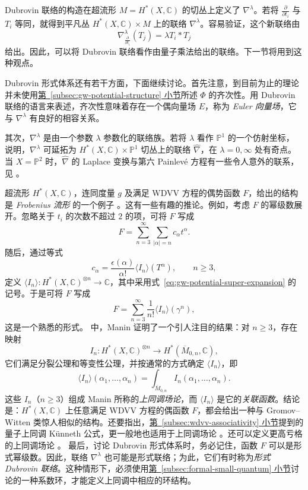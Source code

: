 Dubrovin 联络的构造在超流形 $M=H^*(X,\mathbb C)$ 的切丛上定义了 $\nabla^\lambda$。若将 $\frac{\partial}{\partial t_i}$ 与 $T_i$ 等同，就得到平凡丛
$H^*(X,\mathbb C)\times M$ 上的联络 $\nabla^\lambda$。容易验证，这个新联络由
\[
\nabla^\lambda_{\frac{\partial}{\partial t_i}}(T_j)=\lambda T_i*T_j
\]
给出。因此，可以将 Dubrovin 联络看作由量子乘法给出的联络。下一节将用到这种观点。

Dubrovin 形式体系还有若干方面，下面继续讨论。首先注意，到目前为止的理论并未使用\hyperref[subsec:gw-potential-structure]{第~\ref*{subsec:gw-potential-structure} 小节}所述 $\Phi$ 的齐次性。用 Dubrovin 联络的语言来表述，齐次性意味着存在一个偶向量场 $E$，称为 \emph{Euler 向量场}，它与 $\nabla^\lambda$ 有良好的相容关系。

其次，$\nabla^\lambda$ 是由一个参数 $\lambda$ 参数化的联络族。若将 $\lambda$ 看作 $\mathbb P^1$ 的一个仿射坐标， 说明，$\nabla^\lambda$ 可延拓为 $H^*(X,\mathbb C)\times\mathbb P^1$ 切丛上的联络 $\widehat\nabla$，在 $\lambda=0,\infty$ 处有奇点。当 $X=\mathbb P^2$ 时，$\widehat\nabla$ 的 Laplace 变换与第六 Painlevé 方程有一些令人意外的联系，见 。

超流形 $H^*(X,\mathbb C)$，连同度量 $g$ 及满足 WDVV 方程的偶势函数 $F$，给出的结构是 \emph{Frobenius 流形} 的一个例子 。这有一些有趣的推论。例如，考虑 $F$ 的幂级数展开。忽略关于 $t_i$ 的次数不超过 $2$ 的项，可将 $F$ 写成
\[
F=\sum_{n=3}^{\infty}\sum_{|\alpha|=n}c_\alpha t^\alpha.
\]
随后，通过等式
\[
c_\alpha=\frac{\epsilon(\alpha)}{\alpha!}\langle I_n\rangle(T^\alpha),\qquad n\ge3,
\]
定义 $\langle I_n\rangle\colon H^*(X,\mathbb C)^{\otimes n}\to\mathbb C$，其中采用式~\eqref{eq:gw-potential-super-expansion} 的记号。于是可将 $F$ 写成
\[
F=\sum_{n=3}^{\infty}\frac1{n!}\langle I_n\rangle(\gamma^n),
\]
这是一个熟悉的形式。 中，Manin 证明了一个引人注目的结果：对 $n\ge3$，存在映射
\[
I_n\colon H^*(X,\mathbb C)^{\otimes n}\longrightarrow
H^*(\overline M_{0,n},\mathbb C),
\]
它们满足分裂公理和等变性公理，并按通常的方式确定 $\langle I_n\rangle$，即
\[
\langle I_n\rangle(\alpha_1,\ldots,\alpha_n)
=\int_{\overline M_{0,n}}I_n(\alpha_1,\ldots,\alpha_n).
\]
这些 $I_n$（$n\ge3$）组成 Manin 所称的\emph{上同调场论}，而 $\langle I_n\rangle$ 是它的\emph{关联函数}。结论是：$H^*(X,\mathbb C)$ 上任意满足 WDVV 方程的偶函数 $F$，都会给出一种与 Gromov--Witten 类惊人相似的结构。还要指出，\hyperref[subsec:wdvv-associativity]{第~\ref*{subsec:wdvv-associativity} 小节}提到的量子上同调 Künneth 公式，更一般地也适用于上同调场论 。还可以定义更高亏格的上同调场论 。
最后，讨论 Dubrovin 形式体系时，务必记住，函数 $F$ 可以是形式幂级数。因此，联络 $\nabla^\lambda$ 也可能是形式联络；为此，它们有时称为\emph{形式 Dubrovin 联络}。这种情形下，必须使用\hyperref[subsec:formal-small-quantum]{第~\ref*{subsec:formal-small-quantum} 小节}讨论的一种系数环，才能定义上同调中相应的环结构。


